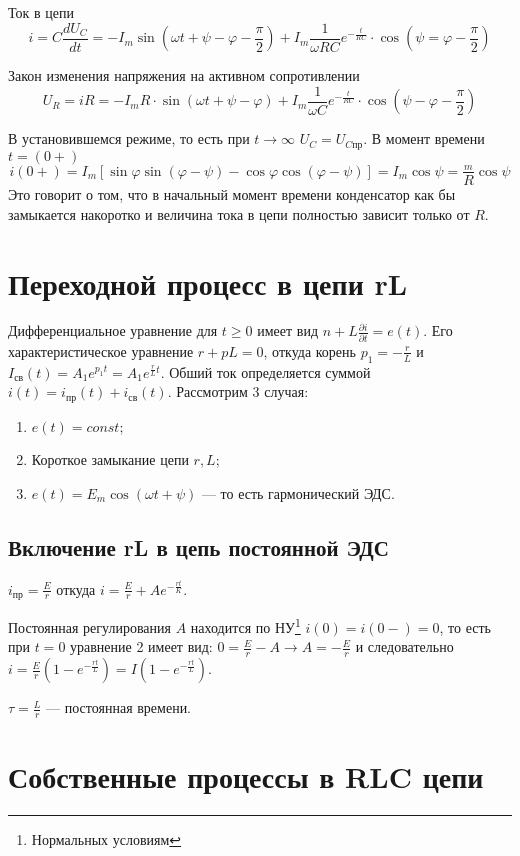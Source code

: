 Ток в цепи
\[ i = C \frac{dU_C}{dt} = -I_m \sin(\omega t + \psi - \varphi -
  \frac{\pi}{2}) + I_m \frac{1}{\omega RC}e^{-\frac{t}{RC}} \cdot
\cos(\psi = \varphi - \frac{\pi}{2}) \]

Закон изменения напряжения на активном сопротивлении
\[ U_R = iR = -I_m R \cdot \sin(\omega t + \psi - \varphi) + I_m
  \frac{1}{\omega C} e^{-\frac{t}{RC}} \cdot \cos(\psi - \varphi -
\frac{\pi}{2}) \]

В установившемся режиме, то есть при $t \to \infty$ $U_C =
U_{Cпр}$. В момент времени $t = (0+)$
\[ i(0+) = I_m[\sin \varphi \sin(\varphi - \psi) - \cos \varphi
\cos(\varphi - \psi)] = I_m \cos \psi = \frac{_m}{R} \cos \psi \]
Это говорит о том, что в начальный момент времени  конденсатор как
бы замыкается накоротко и величина тока в цепи полностью зависит
только от $R$.

\chapter{Переходной процесс в цепи rL}

Дифференциальное уравнение для $t\ge0$  имеет вид $n+L\frac{\partial
i}{\partial t} = e(t)$. Его характеристическое уравнение $r+pL=0$,
откуда корень $p_1=-\frac{r}{L}$ и $I_{св}(t) = A_1 e^{p_1t} = A_1
e^{\frac{r}{L}t}$. Обший ток определяется суммой $i(t) = i_{пр}(t) +i_{св}(t)$.
Рассмотрим 3 случая:
\begin{enumerate}
  \item  $e(t) = const$;
  \item  Короткое замыкание цепи $r, L$;
  \item  $e(t) = E_m \cos(\omega t + \psi)$ — то есть гармонический ЭДС.
\end{enumerate}

\section{Включение rL в цепь постоянной ЭДС}

$i_{пр} = \frac{E}{r}$ откуда $i=\frac{E}{r} + Ae^{-\frac{rt}{K}}$.

Постоянная регулирования $A$ находится по НУ\footnote{Нормальных
условиям} $i(0) = i(0-) = 0$, то есть при $t = 0$ уравнение 2 имеет
вид: $0 = \frac{E}{r}-A \to A = -\frac{E}{r}$ и следовательно $i =
\frac{E}{r} (1 - e^{-\frac{rt}{L}}) = I(1 - e^{-\frac{rt}{L}})$.

$\tau = \frac{L}{r}$ — постоянная времени.

\chapter{Собственные процессы в RLC цепи}

